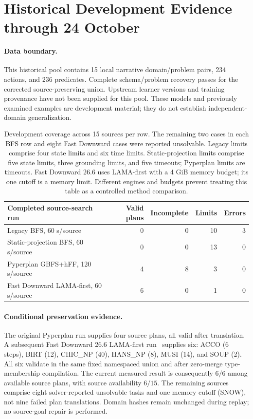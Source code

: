 \documentclass[letterpaper]{article}
\begin{document}
\section{Historical Development Evidence through 24 October}
\paragraph{Data boundary.}
This historical pool contains 15 local narrative domain/problem pairs, 234 actions, and 236 predicates. Complete schema/problem recovery passes for the corrected source-preserving union. Upstream learner versions and training provenance have not been supplied for this pool. These models and previously examined examples are development material; they do not establish independent-domain generalization.

\begin{table}[t]
\centering
\begin{tabular}{lrrrr}
\toprule
Completed source-search run & Valid plans & Incomplete & Limits & Errors\\
\midrule
Legacy BFS, 60 s/source & 0 & 0 & 10 & 3\\
Static-projection BFS, 60 s/source & 0 & 0 & 13 & 0\\
Pyperplan GBFS+hFF, 120 s/source & 4 & 8 & 3 & 0\\
Fast Downward LAMA-first, 60 s/source & 6 & 0 & 1 & 0\\
\bottomrule
\end{tabular}
\caption{Development coverage across 15 sources per row. The remaining two cases in each BFS row and eight Fast Downward cases were reported unsolvable. Legacy limits comprise four state limits and six time limits. Static-projection limits comprise five state limits, three grounding limits, and five timeouts; Pyperplan limits are timeouts. Fast Downward 26.6 uses LAMA-first with a 4 GiB memory budget; its one cutoff is a memory limit. Different engines and budgets prevent treating this table as a controlled method comparison.}
\end{table}

\paragraph{Conditional preservation evidence.}
The original Pyperplan run supplies four source plans, all valid after translation. A subsequent Fast Downward 26.6 LAMA-first run~\cite{helmert2006downward} supplies six: ACCO (6 steps), BIRT (12), CHIC\_NP (40), HANS\_NP (8), MUSI (14), and SOUP (2). All six validate in the same fixed namespaced union and after zero-merge type-membership compilation. The current measured result is consequently $6/6$ among available source plans, with source availability $6/15$. The remaining sources comprise eight solver-reported unsolvable tasks and one memory cutoff (SNOW), not nine failed plan translations. Domain hashes remain unchanged during replay; no source-goal repair is performed.
\end{document}
